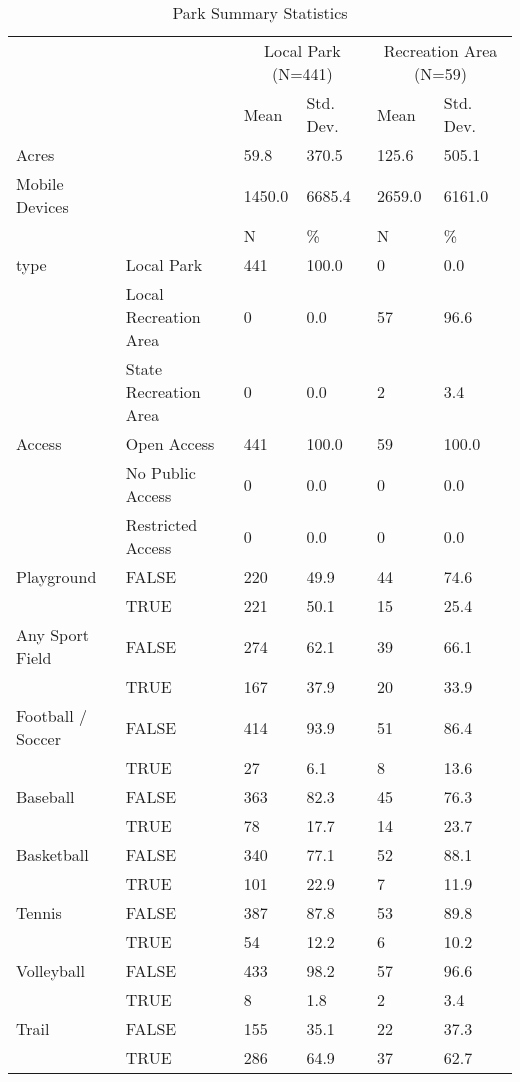 \documentclass[3p, authoryear, review]{elsarticle} %
\begin{document}
\begin{table}

\caption{\label{tab:park-attributes}Park Summary Statistics}
\centering
\begin{tabular}[t]{llllll}
\toprule
\multicolumn{2}{c}{ } & \multicolumn{2}{c}{Local Park (N=441)} & \multicolumn{2}{c}{Recreation Area (N=59)} \\
\cmidrule(l{3pt}r{3pt}){3-4} \cmidrule(l{3pt}r{3pt}){5-6}
  &    & Mean & Std. Dev. & Mean  & Std. Dev. \\
\midrule
Acres &  & 59.8 & 370.5 & 125.6 & 505.1\\
Mobile Devices &  & 1450.0 & 6685.4 & 2659.0 & 6161.0\\
\midrule
 &  & N & \% & N & \%\\
type & Local Park & 441 & 100.0 & 0 & 0.0\\
 & Local Recreation Area & 0 & 0.0 & 57 & 96.6\\
 & State Recreation Area & 0 & 0.0 & 2 & 3.4\\
Access & Open Access & 441 & 100.0 & 59 & 100.0\\
 & No Public Access & 0 & 0.0 & 0 & 0.0\\
 & Restricted Access & 0 & 0.0 & 0 & 0.0\\
Playground & FALSE & 220 & 49.9 & 44 & 74.6\\
 & TRUE & 221 & 50.1 & 15 & 25.4\\
Any Sport Field & FALSE & 274 & 62.1 & 39 & 66.1\\
 & TRUE & 167 & 37.9 & 20 & 33.9\\
Football / Soccer & FALSE & 414 & 93.9 & 51 & 86.4\\
 & TRUE & 27 & 6.1 & 8 & 13.6\\
Baseball & FALSE & 363 & 82.3 & 45 & 76.3\\
 & TRUE & 78 & 17.7 & 14 & 23.7\\
Basketball & FALSE & 340 & 77.1 & 52 & 88.1\\
 & TRUE & 101 & 22.9 & 7 & 11.9\\
Tennis & FALSE & 387 & 87.8 & 53 & 89.8\\
 & TRUE & 54 & 12.2 & 6 & 10.2\\
Volleyball & FALSE & 433 & 98.2 & 57 & 96.6\\
 & TRUE & 8 & 1.8 & 2 & 3.4\\
Trail & FALSE & 155 & 35.1 & 22 & 37.3\\
 & TRUE & 286 & 64.9 & 37 & 62.7\\
\bottomrule
\end{tabular}
\end{table}
\end{document}
